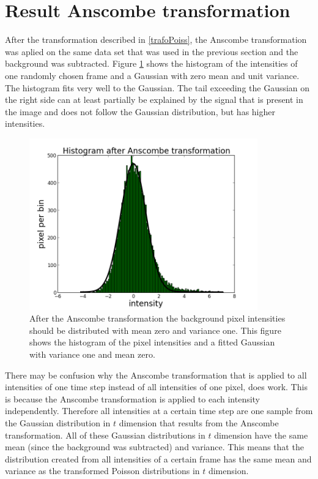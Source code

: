 \section{Result Anscombe transformation}
After the transformation described in \ref{trafoPoiss}, the Anscombe transformation was aplied on the same data set that was used in the previous section and the background was subtracted. Figure \ref{isitAnscombe} shows the histogram of the intensities of one randomly chosen frame and a Gaussian with zero mean and unit variance. The histogram fits very well to the Gaussian. The tail exceeding the Gaussian on the right side can at least partially be explained by the signal that is present in the image and does not follow the Gaussian distribution, but has higher intensities.\newline
\begin{figure}
\centering
\includegraphics[width = 0.88\textwidth]{pictures/anscombeAndFit.png}
	 \caption{After the Anscombe transformation the background pixel intensities should be distributed with mean zero and variance one. This figure shows the histogram of the pixel intensities and a fitted Gaussian with variance one and mean zero.}
	\label{isitAnscombe}
\end{figure}
There may be confusion why the Anscombe transformation that is applied to all intensities of one time step instead of all intensities of one pixel, does work. This is because the Anscombe transformation is applied to each intensity independently. Therefore all intensities at a certain time step are one sample from the Gaussian distribution in $t$ dimension that results from the Anscombe transformation. All of these Gaussian distributions in $t$ dimension have the same mean (since the background was subtracted) and variance. This means that the distribution created from all intensities of a certain frame has the same mean and variance as the transformed Poisson distributions in $t$ dimension.
